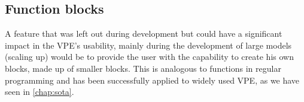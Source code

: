 \subsection{Function blocks}

A feature that was left out during development but could have a significant
impact in the VPE's usability, mainly during the development of large models
(scaling up) would be to provide the user with the capability to create his own
blocks, made up of smaller blocks. This is analogous to functions in regular
programming and has been successfully applied to widely used VPE, as we have
seen in \ref{chap:sota}.
